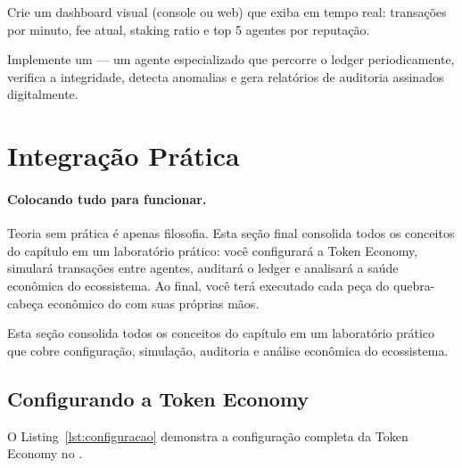 \begin{exercicio}
Crie um dashboard visual (console ou web) que exiba em tempo
real: transações por minuto, fee atual, staking ratio e top 5
agentes por reputação.
\end{exercicio}

\begin{exercicio}
Implemente um  — um agente
especializado que percorre o ledger periodicamente, verifica
a integridade, detecta anomalias e gera relatórios de auditoria
assinados digitalmente.
\end{exercicio}

\section{Integração Prática}
\label{sec:integracao-pratica}

\paragraph{Colocando tudo para funcionar.} Teoria sem prática é apenas filosofia. Esta seção final consolida todos os conceitos do capítulo em um laboratório prático: você configurará a Token Economy, simulará transações entre agentes, auditará o ledger e analisará a saúde econômica do ecossistema. Ao final, você terá executado cada peça do quebra-cabeça econômico do \opencodeeco{} com suas próprias mãos.

Esta seção consolida todos os conceitos do capítulo em um
laboratório prático que cobre configuração, simulação, auditoria
e análise econômica do ecossistema.

\subsection{Configurando a Token Economy}

O Listing~\ref{lst:configuracao} demonstra a configuração
completa da Token Economy no \opencodeeco{}.


